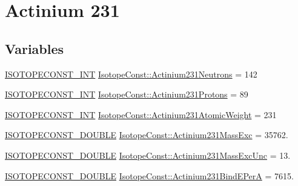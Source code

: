 \hypertarget{group___isotope_const-_actinium-_ac231}{}\section{Actinium 231}
\label{group___isotope_const-_actinium-_ac231}
\subsection*{Variables}
\begin{DoxyCompactItemize}
\item 
\mbox{\hyperlink{group___isotope_const-_macros_ga5f18360b3e99483a35c32d789e62621c}{I\+S\+O\+T\+O\+P\+E\+C\+O\+N\+S\+T\+\_\+\+I\+NT}} \mbox{\hyperlink{group___isotope_const-_actinium-_ac231_ga9d338ddb60d06e308fc01680825cd7bc}{Isotope\+Const\+::\+Actinium231\+Neutrons}} = 142
\item 
\mbox{\hyperlink{group___isotope_const-_macros_ga5f18360b3e99483a35c32d789e62621c}{I\+S\+O\+T\+O\+P\+E\+C\+O\+N\+S\+T\+\_\+\+I\+NT}} \mbox{\hyperlink{group___isotope_const-_actinium-_ac231_ga4273e97bcb0aef662b922791721165eb}{Isotope\+Const\+::\+Actinium231\+Protons}} = 89
\item 
\mbox{\hyperlink{group___isotope_const-_macros_ga5f18360b3e99483a35c32d789e62621c}{I\+S\+O\+T\+O\+P\+E\+C\+O\+N\+S\+T\+\_\+\+I\+NT}} \mbox{\hyperlink{group___isotope_const-_actinium-_ac231_gad10dfbfe69570aa3a6c0988787635214}{Isotope\+Const\+::\+Actinium231\+Atomic\+Weight}} = 231
\item 
\mbox{\hyperlink{group___isotope_const-_macros_ga8f45a7272ce02c0b4c65c44636ed719a}{I\+S\+O\+T\+O\+P\+E\+C\+O\+N\+S\+T\+\_\+\+D\+O\+U\+B\+LE}} \mbox{\hyperlink{group___isotope_const-_actinium-_ac231_ga1e97a84b084d62c6b1b78265dae078fe}{Isotope\+Const\+::\+Actinium231\+Mass\+Exc}} = 35762.
\item 
\mbox{\hyperlink{group___isotope_const-_macros_ga8f45a7272ce02c0b4c65c44636ed719a}{I\+S\+O\+T\+O\+P\+E\+C\+O\+N\+S\+T\+\_\+\+D\+O\+U\+B\+LE}} \mbox{\hyperlink{group___isotope_const-_actinium-_ac231_ga9ff507c726b3820a334b3d6ebe8c976a}{Isotope\+Const\+::\+Actinium231\+Mass\+Exc\+Unc}} = 13.
\item 
\mbox{\hyperlink{group___isotope_const-_macros_ga8f45a7272ce02c0b4c65c44636ed719a}{I\+S\+O\+T\+O\+P\+E\+C\+O\+N\+S\+T\+\_\+\+D\+O\+U\+B\+LE}} \mbox{\hyperlink{group___isotope_const-_actinium-_ac231_gae512ff5c5a1417d3e8d65737d4dfc4f4}{Isotope\+Const\+::\+Actinium231\+Bind\+E\+PerA}} = 7615.
\item 

\end{DoxyCompactItemize}
